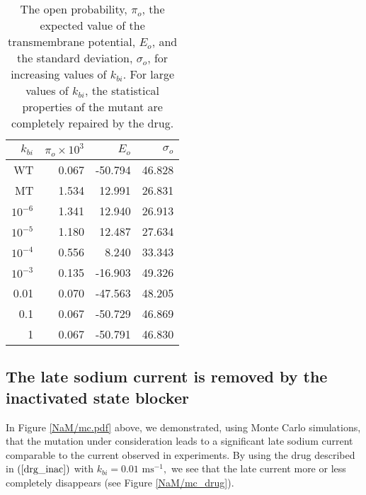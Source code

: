 
\begin{table}  \begin{center}
\begin{tabular}{|r|r|r|r|} \hline
$k_{bi}$ & $\pi_o\times 10^3 $ & $E_o$ & $\sigma_o$ \\ \hline
WT & 0.067 & -50.794 & 46.828 \\ \hline
MT & 1.534 & 12.991 & 26.831 \\ \hline
$10^{-6}$ & 1.341 & 12.940 & 26.913 \\ \hline
$10^{-5}$ & 1.180 & 12.487 & 27.634 \\ \hline
$10^{-4}$ & 0.556 & 8.240 & 33.343 \\ \hline
$10^{-3}$ & 0.135 & -16.903 & 49.326 \\ \hline
0.01 & 0.070 & -47.563 & 48.205 \\ \hline
0.1 & 0.067 & -50.729 & 46.869 \\ \hline
1 & 0.067 & -50.791 & 46.830 \\ \hline
\end{tabular} \end{center}
\caption{The open probability, $\pi_o$, the expected value of the transmembrane potential, $E_o$, and the
standard deviation, $\sigma_o$, for increasing values of $k_{bi}$. For large values of $k_{bi}$, the statistical properties 
of the mutant are completely repaired by the drug. 
}
\label{kbi_stat}
\end{table}

\subsection{The late sodium current is removed by the inactivated state blocker}


In Figure \ref{NaM/mc.pdf} above, we demonstrated, using Monte Carlo simulations, that the
mutation under consideration leads to a significant late sodium current
comparable to the current observed in experiments. By using the drug described
in $\left(  \ref{drg_inac}\right) $ with $k_{bi}=0.01 \text{ ms}^{-1},$ we see that the late
current more or less completely disappears (see Figure \ref{NaM/mc_drug}).

